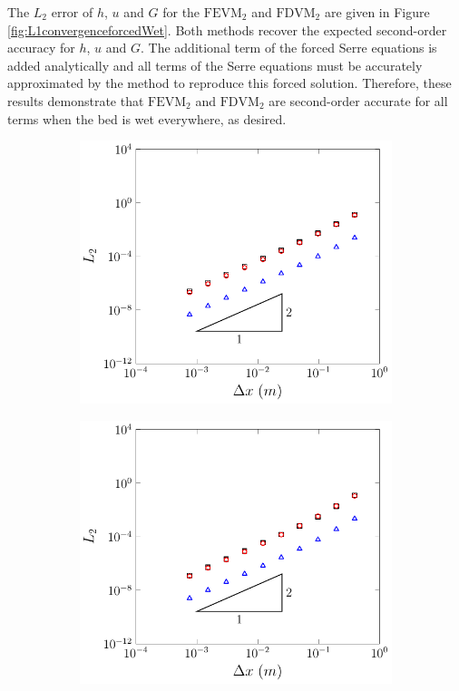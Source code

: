 The $L_2$ error of $h$, $u$ and $G$ for the $\text{FEVM}_2$ and $\text{FDVM}_2$ are given in Figure \ref{fig:L1convergenceforcedWet}. Both methods recover the expected second-order accuracy for $h$, $u$ and $G$. The additional term of the forced Serre equations is added analytically and all terms of the Serre equations must be accurately approximated by the method to reproduce this forced solution. Therefore, these results demonstrate that $\text{FEVM}_2$ and $\text{FDVM}_2$ are second-order accurate for all terms when the bed is wet everywhere, as desired.

\begin{figure}
	\centering
	\begin{subfigure}{0.5\textwidth}
		\includegraphics[width=\textwidth]{./chp5/figures/Forced/Wet/FEVML2.pdf}
	\end{subfigure}%
	\begin{subfigure}{0.5\textwidth}
		\includegraphics[width=\textwidth]{./chp5/figures/Forced/Wet/FDVML2.pdf}

\end{subfigure}
\end{figure}
